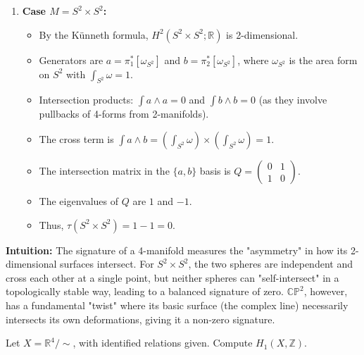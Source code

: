 \begin{solution}
\begin{enumerate}
    \medskip
    \item \textbf{Case $M = S^2 \times S^2$:}
    \begin{itemize}
        \item By the K\"unneth formula, $H^2(S^2 \times S^2; \mathbb{R})$ is 2-dimensional.
        \item Generators are $a = \pi_1^*[\omega_{S^2}]$ and $b = \pi_2^*[\omega_{S^2}]$, where $\omega_{S^2}$ is the area form on $S^2$ with $\int_{S^2} \omega = 1$.
        \item Intersection products: $\int a \wedge a = 0$ and $\int b \wedge b = 0$ (as they involve pullbacks of 4-forms from 2-manifolds).
        \item The cross term is $\int a \wedge b = (\int_{S^2} \omega) \times (\int_{S^2} \omega) = 1$.
        \item The intersection matrix in the $\{a, b\}$ basis is $Q = \begin{pmatrix} 0 & 1 \\ 1 & 0 \end{pmatrix}$.
        \item The eigenvalues of $Q$ are $1$ and $-1$.
        \item Thus, $\tau(S^2 \times S^2) = 1 - 1 = 0$.
    \end{itemize}
\end{enumerate}

\medskip
\textbf{Intuition:}
The signature of a 4-manifold measures the "asymmetry" in how its 2-dimensional surfaces intersect. For $S^2 \times S^2$, the two spheres are independent and cross each other at a single point, but neither spheres can "self-intersect" in a topologically stable way, leading to a balanced signature of zero. $\mathbb{CP}^2$, however, has a fundamental "twist" where its basic surface (the complex line) necessarily intersects its own deformations, giving it a non-zero signature.
\end{solution}

\begin{exercise}
\label{geometry:2019:3}
Let $X = \mathbb{R}^{4} / \sim$, with identified relations given. Compute $H_{1}(X, \mathbb{Z})$.
\end{exercise}

